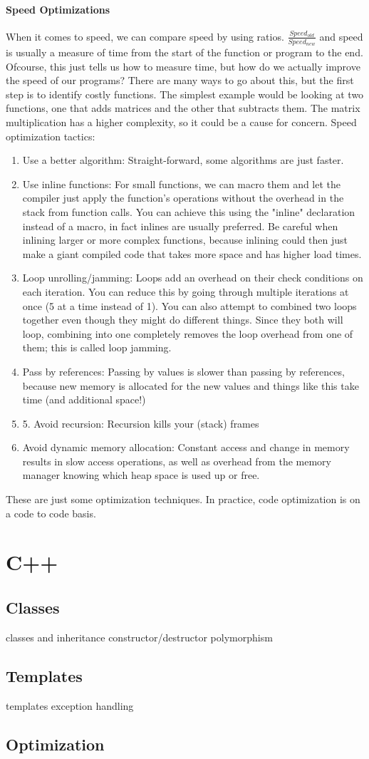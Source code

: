 \paragraph{Speed Optimizations} When it comes to speed, we can compare speed by using ratios. $\frac{Speed_{old}}{Speed_{new}}$ and speed is usually a measure of time from the start of the function or program to the end. Ofcourse, this just tells us how to measure time, but how do we actually improve the speed of our programs? There are many ways to go about this, but the first step is to identify costly functions. The simplest example would be looking at two functions, one that adds matrices and the other that subtracts them. The matrix multiplication has a higher complexity, so it could be a cause for concern.\newline
Speed optimization tactics:
\begin{enumerate}
	\item Use a better algorithm: Straight-forward, some algorithms are just faster.
	\item Use inline functions: For small functions, we can macro them and let the compiler just apply the function's operations without the overhead in the stack from function calls. You can achieve this using the "inline" declaration instead of a macro, in fact inlines are usually preferred. Be careful when inlining larger or more complex functions, because inlining could then just make a giant compiled code that takes more space and has higher load times.
	\item Loop unrolling/jamming: Loops add an overhead on their check conditions on each iteration. You can reduce this by going through multiple iterations at once (5 at a time instead of 1). You can also attempt to combined two loops together even though they might do different things. Since they both will loop, combining into one completely removes the loop overhead from one of them; this is called loop jamming.
	\item Pass by references: Passing by values is slower than passing by references, because new memory is allocated for the new values and things like this take time (and additional space!)
	\item 5. Avoid recursion: Recursion kills your (stack) frames
	\item Avoid dynamic memory allocation: Constant access and change in memory results in slow access operations, as well as overhead from the memory manager knowing which heap space is used up or free.
\end{enumerate}
These are just some optimization techniques. In practice, code optimization is on a code to code basis.

\section{C++}
\subsection{Classes}
classes and inheritance
constructor/destructor
polymorphism
\subsection{Templates}
templates
exception handling
\subsection{Optimization}